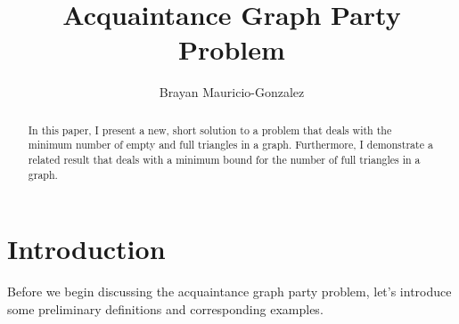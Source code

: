 \documentclass[10pt]{amsart}
\begin{document}
\parskip10pt
\parindent12pt
\baselineskip16pt


\def\G{\widetilde{G}}
\def\B{\widetilde{B}}
\def\T{\widetilde{T}}
\def\C{\mathbb{C}}
\def\A{\mathbb{A}}
\def\Z{\mathbb{Z}}
\def\R{\mathbb{R}}
\def\Q{\mathbb{Q}}
\def\N{\mathbb{N}}
\def\C{\mathbb{C}}
\def\F{\mathbb{F}}
\def\I{\mathbb{I}}
\def\H{\mathcal{H}}
\def\e{\varepsilon}
\def\s{\underline s}
\def\z{\zeta }
\def\vp{\varpi }
\def\O{\mathcal O}
\def\v{\upsilon }
\def\U{\Upsilon }
\def\p{\wp }
\def\p{\mathfrak{p}}
\def\B{\mathfrak{B}}

\newtheorem{theorem}{Theorem}%
\newtheorem{lemma}[theorem]{Lemma}
\newcommand{\bfloor}[1]{\Bigg \lfloor #1 \Bigg \rfloor}
\newcommand{\bparen}[1]{\Bigg \lparen #1 \Bigg \rparen}


\title{Acquaintance Graph Party Problem}

\author{Brayan Mauricio-Gonzalez}

\begin{abstract}
    In this paper, I present a new, short solution to a problem that deals with the 
    minimum number of empty and full triangles in a graph. Furthermore, I demonstrate a related 
    result that deals with a minimum bound for the number of full triangles in a graph.
\end{abstract}

\maketitle


\section{Introduction}

Before we begin discussing the acquaintance graph party problem, let's introduce some 
preliminary definitions and corresponding examples.
\end{document}
